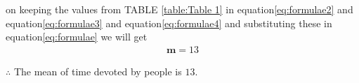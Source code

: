 \documentclass[journal, 12pt, twocolumn]{IEEEtran}
\let\vec\mathbf
\begin{document}
on keeping the values from TABLE \ref{table:Table 1} in equation\eqref{eq:formulae2} and equation\eqref{eq:formulae3} and equation\eqref{eq:formulae4} and substituting these in equation\eqref{eq:formulae} we will get
\begin{align}
    \vec{m}=13
\end{align}

$\therefore$ The mean of time devoted by people is $13$.
\end{document}
